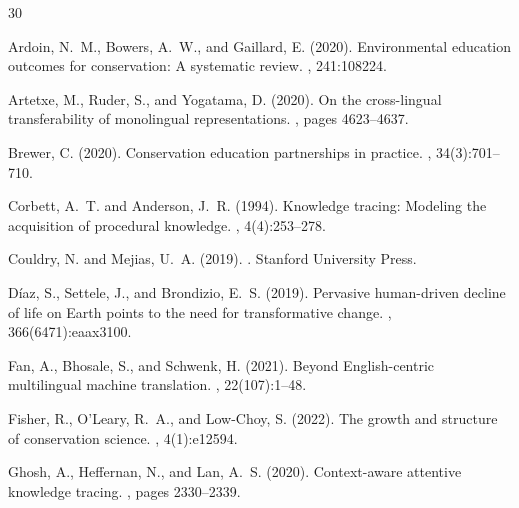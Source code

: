 \begin{thebibliography}{30}

Ardoin, N.~M., Bowers, A.~W., and Gaillard, E. (2020).
\newblock Environmental education outcomes for conservation: A systematic review.
, 241:108224.

Artetxe, M., Ruder, S., and Yogatama, D. (2020).
\newblock On the cross-lingual transferability of monolingual representations.
, pages 4623--4637.

Brewer, C. (2020).
\newblock Conservation education partnerships in practice.
, 34(3):701--710.

Corbett, A.~T. and Anderson, J.~R. (1994).
\newblock Knowledge tracing: Modeling the acquisition of procedural knowledge.
, 4(4):253--278.

Couldry, N. and Mejias, U.~A. (2019).
.
\newblock Stanford University Press.

D\'{i}az, S., Settele, J., and Brondizio, E.~S. (2019).
\newblock Pervasive human-driven decline of life on Earth points to the need for transformative change.
, 366(6471):eaax3100.

Fan, A., Bhosale, S., and Schwenk, H. (2021).
\newblock Beyond English-centric multilingual machine translation.
, 22(107):1--48.

Fisher, R., O'Leary, R.~A., and Low-Choy, S. (2022).
\newblock The growth and structure of conservation science.
, 4(1):e12594.

Ghosh, A., Heffernan, N., and Lan, A.~S. (2020).
\newblock Context-aware attentive knowledge tracing.
, pages 2330--2339.


\end{thebibliography}
